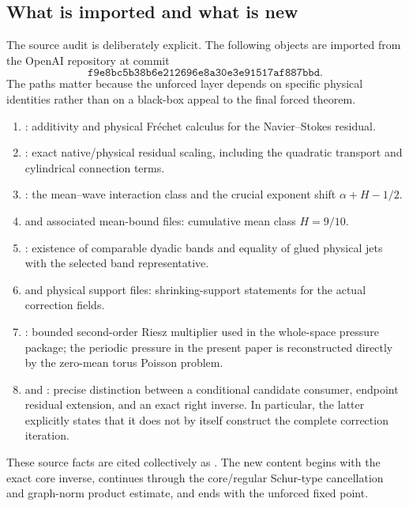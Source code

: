 \documentclass[11pt]{article}
\numberwithin{equation}{section}
\begin{document}
\subsection{What is imported and what is new}
The source audit is deliberately explicit.  The following objects are imported from the OpenAI repository at commit
\[
\texttt{f9e8bc5b38b6e212696e8a30e3e91517af887bbd}.
\]
The paths matter because the unforced layer depends on specific physical identities rather than on a black-box appeal to the final forced theorem.
\begin{enumerate}[label=(I\arabic*)]
\item {}: additivity and physical Fr\'echet calculus for the Navier--Stokes residual.
\item {}: exact native/physical residual scaling, including the quadratic transport and cylindrical connection terms.
\item {}: the mean--wave interaction class and the crucial exponent shift \(\alpha+H-1/2\).
\item {} and associated mean-bound files: cumulative mean class \(H=9/10\).
\item {}: existence of comparable dyadic bands and equality of glued physical jets with the selected band representative.
\item {} and physical support files: shrinking-support statements for the actual correction fields.
\item {}: bounded second-order Riesz multiplier used in the whole-space pressure package; the periodic pressure in the present paper is reconstructed directly by the zero-mean torus Poisson problem.
\item {} and : precise distinction between a conditional candidate consumer, endpoint residual extension, and an exact right inverse.  In particular, the latter explicitly states that it does not by itself construct the complete correction iteration.
\end{enumerate}
These source facts are cited collectively as \cite{OpenAIRepo2026}.  The new content begins with the exact core inverse, continues through the core/regular Schur-type cancellation and graph-norm product estimate, and ends with the unforced fixed point.
\end{document}
